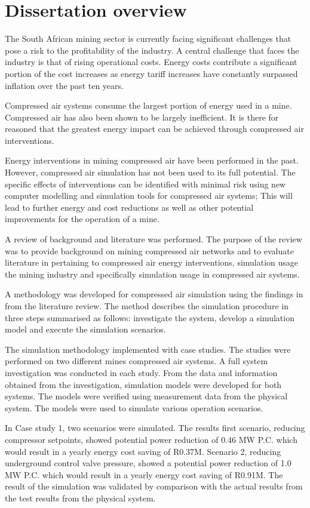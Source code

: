 	 \section{Dissertation overview}
		The South African mining sector is currently facing significant challenges that pose a risk to the profitability of the industry. A central challenge that faces the industry is that of rising operational costs. Energy costs contribute a significant portion of the cost increases as energy tariff increases have constantly surpassed inflation over the past ten years.
	 \par
		Compressed air systems consume the largest portion of energy used in a mine. Compressed air has also been shown to be largely inefficient. It is there for reasoned that the greatest energy impact can be achieved through compressed air interventions.
	 \par 
		Energy interventions in mining compressed air have been performed in the past. However, compressed air simulation has not been used to its full potential.  The specific effects of interventions can be identified with minimal risk using new computer modelling and simulation tools for compressed air systems; This will lead to further energy and cost reductions as well as other potential improvements for the operation of a mine.
	 \par 
	 A review of background and literature was performed. The purpose of the review was to provide background on mining compressed air networks and to evaluate literature in pertaining to compressed air energy interventions, simulation usage the mining industry and specifically simulation usage in compressed air systems.
	 \par 
		A methodology was developed for compressed air simulation using the findings in from the literature review. The method describes the simulation procedure in three steps summarised as follows: investigate the system, develop a simulation model and execute the simulation scenarios.
	 \par 
The simulation methodology implemented with case studies. The studies were performed on two different mines compressed air systems. A full system investigation was conducted in each study. From the data and information obtained from the investigation, simulation models were developed for both systems. The models were verified using measurement data from the physical system. The models were used to simulate various operation scenarios.
	 \par 
In Case study 1, two scenarios were simulated. The results first scenario, reducing compressor setpoints, showed potential power reduction of 0.46 MW P.C. which would result in a yearly energy cost saving of R0.37M. Scenario 2, reducing underground control valve pressure, showed a potential power reduction of 1.0 MW P.C. which would result in a yearly energy cost saving of R0.91M. The result of the simulation was validated by comparison with the actual results from the test results from the physical system.
